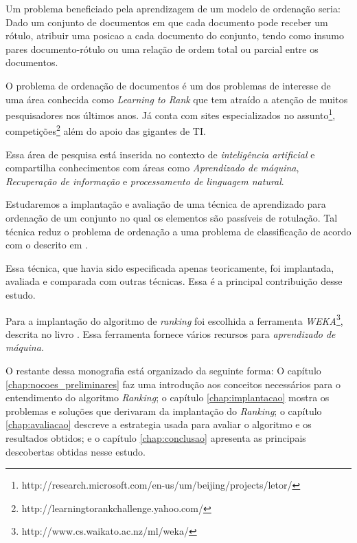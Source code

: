 Um problema beneficiado pela aprendizagem de um modelo de ordenação seria: Dado um conjunto de documentos em que cada documento pode receber um rótulo, atribuir uma posicao a cada documento do conjunto, tendo como insumo pares documento-rótulo ou uma relação de ordem total ou parcial entre os documentos.

O problema de ordenação de documentos é um dos problemas de interesse de uma área  conhecida como \emph{Learning to Rank} que tem atraído a atenção de muitos pesquisadores nos últimos anos. Já conta com sites especializados no assunto\footnote{http://research.microsoft.com/en-us/um/beijing/projects/letor/}, competições\footnote{http://learningtorankchallenge.yahoo.com/} além do apoio das gigantes de TI.

Essa área de pesquisa está inserida no contexto de \emph{inteligência artificial} e compartilha conhecimentos com áreas como \emph{Aprendizado de máquina}, \emph{Recuperação de informação} e \emph{processamento de linguagem natural}.

Estudaremos a implantação e avaliação de uma técnica de aprendizado para ordenação de um conjunto no qual os elementos são passíveis de rotulação. Tal técnica reduz o problema de ordenação a uma problema de classificação de acordo com o descrito em \cite{langford08}.

Essa técnica, que havia sido especificada apenas teoricamente, foi implantada, avaliada e comparada com outras técnicas. Essa é a  principal contribuição desse estudo.

Para a implantação do algoritmo de \emph{ranking} foi escolhida a ferramenta \emph{WEKA}\footnote{http://www.cs.waikato.ac.nz/ml/weka/}, descrita no livro \cite{wekabook}. Essa ferramenta fornece vários recursos para \emph{aprendizado de máquina}.

O restante dessa monografia está organizado da seguinte forma: O capítulo \ref{chap:nocoes_preliminares} faz uma introdução aos conceitos necessários para o entendimento do algoritmo \emph{Ranking}; o capítulo \ref{chap:implantacao} mostra os problemas e soluções que derivaram da implantação do \emph{Ranking}; o capítulo \ref{chap:avaliacao} descreve a estrategia usada para avaliar o algoritmo e os resultados obtidos; e o capítulo \ref{chap:conclusao} apresenta as principais descobertas obtidas nesse estudo.